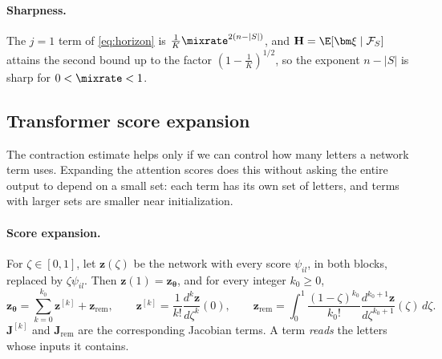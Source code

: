 \paragraph{Sharpness.}\label{rem:tight} The $j=1$ term of \cref{eq:horizon} is $\frac{1}{K}\mixrate^{2(n-|S|)}$, and $\mathbf H=\E[\bm\xi\mid\mathcal F_S]$ attains the second bound up to the
factor $(1-\frac{1}{K})^{1/2}$, so the exponent $n-|S|$ is sharp for $0<\mixrate<1$.

\subsection{Transformer score expansion}
\label{app:model-spectrum}

The contraction estimate helps only if we can control how many letters a network term uses. Expanding the attention scores does
this without asking the entire output to depend on a small set: each term has its own set of letters, and terms with larger sets
are smaller near initialization.

\paragraph{Score expansion.} For $\zeta\in[0,1]$, let $\bm z(\zeta)$ be the network with every score $\psi_{il}$, in both blocks, replaced by
$\zeta\psi_{il}$. Then $\bm z(1)=\bm z_{\bm\theta}$, and for every integer $k_0\ge0$,
\begin{equation}
 \bm z_{\bm\theta}=\sum_{k=0}^{k_0}\bm z^{[k]}+\bm z_{\mathrm{rem}},\qquad
 \bm z^{[k]}=\frac{1}{k!}\frac{d^k\bm z}{d\zeta^k}(0),\qquad
 \bm z_{\mathrm{rem}}=\int_0^1\frac{(1-\zeta)^{k_0}}{k_0!}\frac{d^{k_0+1}\bm z}{d\zeta^{k_0+1}}(\zeta)\,d\zeta .
 \label{eq:score-split}
\end{equation}
$\mathbf J^{[k]}$ and $\mathbf J_{\mathrm{rem}}$ are the corresponding Jacobian terms. A term \emph{reads} the letters whose inputs it contains.

